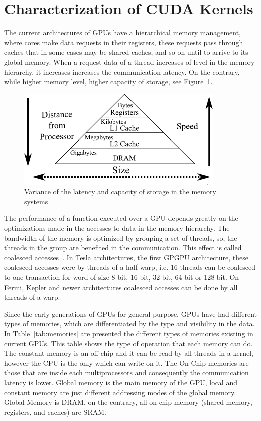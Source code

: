 \section{Characterization of CUDA Kernels}\label{sec:characterization}
The current architectures of GPUs have a hierarchical memory management, where cores make data requests in their registers, these requests pass through caches that in some cases may be shared caches, and so on until to arrive to its global memory. When a request data of a thread increases of level in the memory hierarchy, it increases increases the communication latency. On the contrary, while higher memory level, higher  capacity of storage, see Figure~\ref{fig:PyrLatency}. 

\begin{figure}[htpb]
\centering
\includegraphics[scale=.75]{./images/memhierarchy.png}
\caption{Variance of the latency and capacity of storage in the memory systems}
\label{fig:PyrLatency}
\end{figure}

The performance of a function executed over a GPU depends greatly on the optimizations made in the accesses to data in the memory hierarchy. The bandwidth of the memory is optimized by grouping a set of threads, so, the threads in the group are benefited in the communication. This effect is called coalesced accesses~\citep{Wu:2013:Coalesced, Che:2011}. In Tesla architectures, the first GPGPU architecture, these coalesced accesses were by threads of a half warp, i.e. 16 threads can be coalesced to one transaction for word of size 8-bit, 16-bit, 32 bit, 64-bit or 128-bit. On Fermi, Kepler and newer architectures coalesced accesses can be done by all threads of a warp.

Since the early generations of GPUs for general purpose, GPUs have had different types of memories, which are differentiated by the type and visibility in the data. In Table~\ref{tab:memories} are presented the different types of memories existing in current GPUs. This table shows the type of operation that each memory can do. 
The constant memory is an off-chip and it can be read by all threads in a kernel, however the CPU is the only which can write on it. 
The On Chip memories are those that are inside each multiprocessors and consequently the communication latency is lower. Global memory is the main memory of the GPU, local and constant memory are just different addressing modes of the global memory. Global Memory is DRAM, on the contrary, all on-chip memory (shared memory, registers, and caches) are SRAM. 

